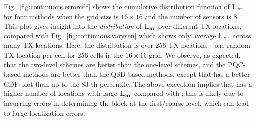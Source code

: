 Fig.~\ref{fig:continuous.errorcdf} shows the cumulative distribution function of $\mathrm{L_{err}}$ for four methods when the grid size is $16\times16$ and the number of sensors is 8.
This plot gives insight into the {\em distribution} of $\mathrm{L_{err}}$ over different TX locations, 
compared with Fig.~\ref{fig:continuous.varysen} which shows only average $\mathrm{L_{err}}$ across many TX locations. 
Here, the distribution is over 256 TX locations---one random TX location per cell for 256 cells in the $16\times 16$ grid.
We observe, as expected, that the two-level schemes are better than the one-level schemes, and the PQC-based methods are better than the QSD-based methods, except that \povm has a better CDF plot than
\pqcone up to the 83-th percentile. The above exception implies that \povm has a higher number of locations with large $\mathrm{L_{err}}$ compared with \pqcone;
this is likely due to \povm incurring errors in determining the block at the first/coarse level, which can lead to large localization errors.








